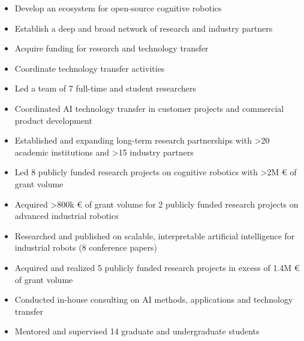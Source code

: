 
\begin{itemize}
  \item Develop an ecosystem for open-source cognitive robotics
  \item Establish a deep and broad network of research and industry partners
  \item Acquire funding for research and technology transfer
  \item Coordinate technology transfer activities
\end{itemize}

\medskip

\begin{itemize}
  \item Led a team of 7 full-time and student researchers
  \item Coordinated AI technology transfer in customer projects and commercial product development
  \item Established and expanding long-term research partnerships with >20 academic institutions and >15 industry partners
  \item Led 8 publicly funded research projects on cognitive robotics with >2M € of grant volume
  \item Acquired >800k € of grant volume for 2 publicly funded research projects on advanced industrial robotics
\end{itemize}

\medskip

\begin{itemize}
  \item Researched and published on scalable, interpretable artificial intelligence for industrial robots (8 conference papers)
  \item Acquired and realized 5 publicly funded research projects in excess of 1.4M € of grant volume
  \item Conducted in-house consulting on AI methods, applications and technology transfer
  \item Mentored and supervised 14 graduate and undergraduate students
\end{itemize}

